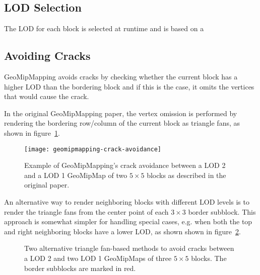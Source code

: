 \subsection{LOD Selection}
The LOD for each block is selected at runtime and is based on a 

\subsection{Avoiding Cracks}

GeoMipMapping avoids cracks by checking whether the
current block has a higher LOD than the bordering block and if this is the case,
it omits the vertices that would cause the crack.

In the original GeoMipMapping paper,
the vertex omission is performed by rendering the bordering row/column of the current block
as triangle fans, as shown in figure~\ref{fig:geomipmapping-crack-avoidance}.

\begin{figure}[H]
  \centering
  \texttt{[image: geomipmapping-crack-avoidance]}
  \caption{Example of GeoMipMapping's crack avoidance between a LOD 2 and a LOD 1 GeoMipMap of two $5 \times 5$ blocks as described in the original paper.}\label{fig:geomipmapping-crack-avoidance}
\end{figure}

An alternative way to render neighboring blocks with different LOD levels is to render the triangle fans from the center point of each $3 \times 3$ border subblock. 
This approach is somewhat simpler for handling special cases, e.g. when both the top and right neighboring blocks have a lower LOD,
as shown shown in figure~\ref{fig:geomipmapping-crack-avoidance-alternative}.


\begin{figure}[H]
  \centering
  \qquad
  \caption{Two alternative triangle fan-based methods to avoid cracks between a LOD 2 and two LOD 1 GeoMipMaps of three $5 \times 5$ blocks. The border subblocks are marked in red.}\label{fig:geomipmapping-crack-avoidance-alternative}
\end{figure}

